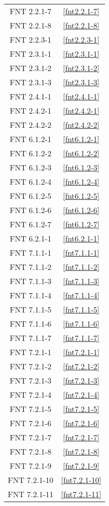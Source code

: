 \begin{multicols}{2}
\begin{center}
\begin{supertabular}{cc}
	FNT 2.2.1-7	&	\ref{fnt2.2.1-7}\\
	FNT 2.2.1-8	&	\ref{fnt2.2.1-8}\\
	FNT 2.2.3-1	&	\ref{fnt2.2.3-1}\\
	\hline
	FNT 2.3.1-1	&	\ref{fnt2.3.1-1}\\
	FNT 2.3.1-2	&	\ref{fnt2.3.1-2}\\
	FNT 2.3.1-3	&	\ref{fnt2.3.1-3}\\
	\hline
	FNT 2.4.1-1	&	\ref{fnt2.4.1-1}\\
	FNT 2.4.2-1	&	\ref{fnt2.4.2-1}\\
	FNT 2.4.2-2	&	\ref{fnt2.4.2-2}\\
	\hline\hline
	FNT 6.1.2-1	&	\ref{fnt6.1.2-1}\\
	FNT 6.1.2-2	&	\ref{fnt6.1.2-2}\\
	FNT 6.1.2-3	&	\ref{fnt6.1.2-3}\\
	FNT 6.1.2-4	&	\ref{fnt6.1.2-4}\\
	FNT 6.1.2-5	&	\ref{fnt6.1.2-5}\\
	FNT 6.1.2-6	&	\ref{fnt6.1.2-6}\\
	FNT 6.1.2-7	&	\ref{fnt6.1.2-7}\\
	FNT 6.2.1-1	&	\ref{fnt6.2.1-1}\\
	\hline\hline
	FNT 7.1.1-1	&	\ref{fnt7.1.1-1}\\
	FNT 7.1.1-2	&	\ref{fnt7.1.1-2}\\
	FNT 7.1.1-3	&	\ref{fnt7.1.1-3}\\
	FNT 7.1.1-4	&	\ref{fnt7.1.1-4}\\
	FNT 7.1.1-5	&	\ref{fnt7.1.1-5}\\
	FNT 7.1.1-6	&	\ref{fnt7.1.1-6}\\
	FNT 7.1.1-7	&	\ref{fnt7.1.1-7}\\
	\hline
	FNT 7.2.1-1	&	\ref{fnt7.2.1-1}\\
	FNT 7.2.1-2	&	\ref{fnt7.2.1-2}\\
	FNT 7.2.1-3	&	\ref{fnt7.2.1-3}\\
	FNT 7.2.1-4	&	\ref{fnt7.2.1-4}\\
	FNT 7.2.1-5	&	\ref{fnt7.2.1-5}\\
	FNT 7.2.1-6	&	\ref{fnt7.2.1-6}\\
	FNT 7.2.1-7	&	\ref{fnt7.2.1-7}\\
	FNT 7.2.1-8	&	\ref{fnt7.2.1-8}\\
	FNT 7.2.1-9	&	\ref{fnt7.2.1-9}\\
	FNT 7.2.1-10	&	\ref{fnt7.2.1-10}\\
	FNT 7.2.1-11	&	\ref{fnt7.2.1-11}\\
\end{supertabular}
\endgroup
\end{center}
\end{multicols}